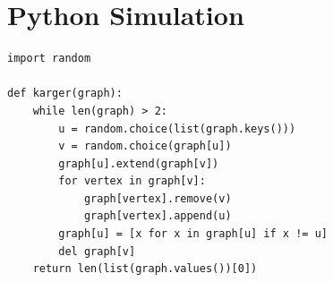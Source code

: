 \documentclass[12pt]{article}
\begin{document}
\section{Python Simulation}

\begin{verbatim}
import random

def karger(graph):
    while len(graph) > 2:
        u = random.choice(list(graph.keys()))
        v = random.choice(graph[u])
        graph[u].extend(graph[v])
        for vertex in graph[v]:
            graph[vertex].remove(v)
            graph[vertex].append(u)
        graph[u] = [x for x in graph[u] if x != u]
        del graph[v]
    return len(list(graph.values())[0])
\end{verbatim}
\end{document}
